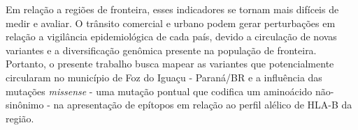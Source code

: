 \begin{justify}
Em relação a regiões de fronteira, esses indicadores se tornam mais difíceis de medir e avaliar. O trânsito comercial e urbano podem gerar perturbações em relação a vigilância epidemiológica de cada país, devido a circulação de  novas variantes e a diversificação genômica presente na população de fronteira. Portanto, o presente trabalho busca mapear as variantes que potencialmente circularam no município de Foz do Iguaçu - Paraná/BR e a influência das mutações \textit{missense} - uma mutação pontual que codifica um aminoácido não-sinônimo -  na apresentação de epítopos em relação ao perfil alélico de HLA-B da região.

\end{justify}